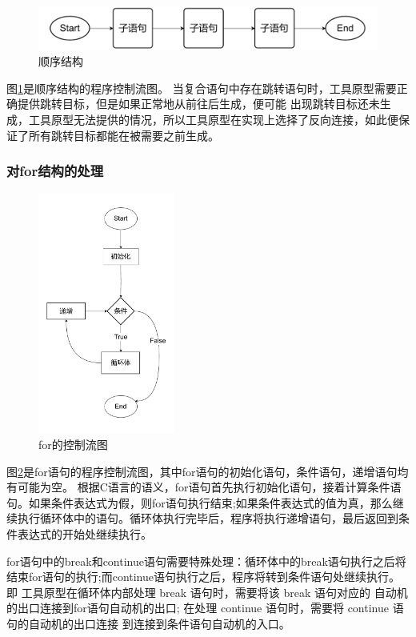 \begin{figure}[htbp]
	\centering
	\includegraphics[width=1\textwidth]{pictures/顺序结构.pdf}
	\caption{顺序结构}
	\label{fig:顺序结构}
\end{figure}

图\ref{fig:顺序结构}是顺序结构的程序控制流图。
当复合语句中存在跳转语句时，工具原型需要正确提供跳转目标，但是如果正常地从前往后生成，便可能
出现跳转目标还未生成，工具原型无法提供的情况，所以工具原型在实现上选择了反向连接，如此便保证了所有跳转目标都能在被需要之前生成。


\subsubsection{对for结构的处理}

 \begin{figure}[htbp]
	\centering
	\includegraphics[width=0.4\textwidth]{pictures/for结构.pdf}
	\caption{for的控制流图}
	\label{fig:for的控制流图}
\end{figure}

图\ref{fig:for的控制流图}是for语句的程序控制流图，其中for语句的初始化语句，条件语句，递增语句均有可能为空。
根据C语言的语义，for语句首先执行初始化语句，接着计算条件语句。如果条件表达式为假，则for语句执行结束;如果条件表达式的值为真，那么继续执行循环体中的语句。循环体执行完毕后，程序将执行递增语句，最后返回到条件表达式的开始处继续执行。

for语句中的break和continue语句需要特殊处理：循环体中的break语句执行之后将结束for语句的执行;而continue语句执行之后，程序将转到条件语句处继续执行。即
工具原型在循环体内部处理 break 语句时，需要将该 break 语句对应的
自动机的出口连接到for语句自动机的出口; 在处理 continue 语句时，需要将 continue 语句的自动机的出口连接
到连接到条件语句自动机的入口。\\


